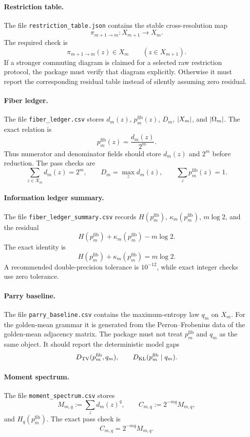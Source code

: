 \paragraph{Restriction table.}
The file \texttt{restriction\_table.json} contains the stable cross-resolution map
\[
\pi_{m+1\to m}:X_{m+1}\to X_m.
\]
The required check is
\[
\pi_{m+1\to m}(z)\in X_m
\qquad(z\in X_{m+1}).
\]
If a stronger commuting diagram is claimed for a selected raw restriction protocol, the package must verify that diagram explicitly.  Otherwise it must report the corresponding residual table instead of silently assuming zero residual.

\paragraph{Fiber ledger.}
The file \texttt{fiber\_ledger.csv} stores \(d_m(z)\), \(p_m^{\mathrm{fib}}(z)\), \(D_m\), \(\left|X_m\right|\), and \(\left|\Omega_m\right|\).  The exact relation is
\[
p_m^{\mathrm{fib}}(z)=\frac{d_m(z)}{2^m}.
\]
Thus numerator and denominator fields should store \(d_m(z)\) and \(2^m\) before reduction.  The pass checks are
\[
\sum_{z\in X_m}d_m(z)=2^m,\qquad
D_m=\max_z d_m(z),\qquad
\sum_zp_m^{\mathrm{fib}}(z)=1.
\]

\paragraph{Information ledger summary.}
The file \texttt{fiber\_ledger\_summary.csv} records \(H(p_m^{\mathrm{fib}})\), \(\kappa_m(p_m^{\mathrm{fib}})\), \(m\log2\), and the residual
\[
H(p_m^{\mathrm{fib}})+\kappa_m(p_m^{\mathrm{fib}})-m\log2.
\]
The exact identity is
\[
H(p_m^{\mathrm{fib}})+\kappa_m(p_m^{\mathrm{fib}})=m\log2.
\]
A recommended double-precision tolerance is \(10^{-12}\), while exact integer checks use zero tolerance.

\paragraph{Parry baseline.}
The file \texttt{parry\_baseline.csv} contains the maximum-entropy law \(q_m\) on \(X_m\).  For the golden-mean grammar it is generated from the Perron--Frobenius data of the golden-mean adjacency matrix.  The package must not treat \(p_m^{\mathrm{fib}}\) and \(q_m\) as the same object.  It should report the deterministic model gaps
\[
D_{\mathrm{TV}}(p_m^{\mathrm{fib}},q_m),
\qquad
D_{\mathrm{KL}}(p_m^{\mathrm{fib}}\mid q_m).
\]

\paragraph{Moment spectrum.}
The file \texttt{moment\_spectrum.csv} stores
\[
M_{m,q}:=\sum_zd_m(z)^q,\qquad
C_{m,q}:=2^{-mq}M_{m,q},
\]
and \(H_q(p_m^{\mathrm{fib}})\).  The exact pass check is
\[
C_{m,q}=2^{-mq}M_{m,q}.
\]

